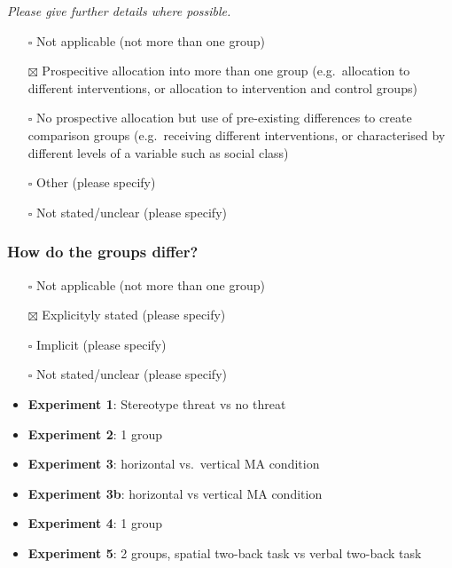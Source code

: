 \documentclass[
  doc, a4paper]{apa7}
\providecommand{\tightlist}{%
  \setlength{\itemsep}{0pt}\setlength{\parskip}{0pt}}
\begin{document}
\emph{Please give further details where possible.}

\begin{itemize}
\tightlist
\item[$\square$]
  Not applicable (not more than one group)\\
\item[$\boxtimes$]
  Prospecitive allocation into more than one group (e.g.~allocation to different interventions, or allocation to intervention and control groups)\\
\item[$\square$]
  No prospective allocation but use of pre-existing differences to create comparison groups (e.g.~receiving different interventions, or characterised by different levels of a variable such as social class)\\
\item[$\square$]
  Other (please specify)\\
\item[$\square$]
  Not stated/unclear (please specify)
\end{itemize}

\subsubsection{How do the groups differ?}\label{how-do-the-groups-differ}

\begin{itemize}
\item[$\square$]
  Not applicable (not more than one group)\\
\item[$\boxtimes$]
  Explicityly stated (please specify)\\
\item[$\square$]
  Implicit (please specify)\\
\item[$\square$]
  Not stated/unclear (please specify)
\item
  \textbf{Experiment 1}: Stereotype threat vs no threat\\
\item
  \textbf{Experiment 2}: 1 group\\
\item
  \textbf{Experiment 3}: horizontal vs.~vertical MA condition\\
\item
  \textbf{Experiment 3b}: horizontal vs vertical MA condition\\
\item
  \textbf{Experiment 4}: 1 group
\item
  \textbf{Experiment 5}: 2 groups, spatial two-back task vs verbal two-back task
\end{itemize}
\end{document}
